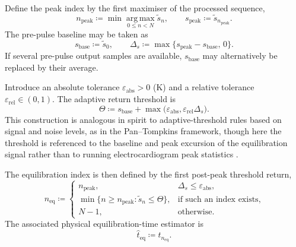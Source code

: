 Define the peak index by the first maximiser of the processed sequence,
\begin{equation}
    n_{\mathrm{peak}}
    \coloneqq
    \min\operatorname*{arg\,max}_{0\le n < N} \tilde s_n,
    \qquad
    s_{\mathrm{peak}} \coloneqq \tilde s_{n_{\mathrm{peak}}}.
    \label{eq:app-peak-index}
\end{equation}
The pre-pulse baseline may be taken as
\begin{equation}
    s_{\mathrm{base}} \coloneqq \tilde s_0,
    \qquad
    \Delta_s \coloneqq \max\{s_{\mathrm{peak}}-s_{\mathrm{base}},\,0\}.
    \label{eq:app-baseline-rise}
\end{equation}
If several pre-pulse output samples are available, \(s_{\mathrm{base}}\) may alternatively be replaced by their average.

Introduce an absolute tolerance \(\varepsilon_{\mathrm{abs}}>0\) (K) and a relative tolerance
\(\varepsilon_{\mathrm{rel}}\in(0,1)\). The adaptive return threshold is
\begin{equation}
    \Theta
    \coloneqq
    s_{\mathrm{base}}
    +
    \max\!\bigl(
    \varepsilon_{\mathrm{abs}},
    \varepsilon_{\mathrm{rel}}\Delta_s
    \bigr).
    \label{eq:app-threshold}
\end{equation}
This construction is analogous in spirit to adaptive-threshold rules based on signal and noise levels, as in the Pan--Tompkins framework, though here the threshold is referenced to the baseline and peak excursion of the equilibration signal rather than to running electrocardiogram peak statistics \cite{Pan_1985}.

The equilibration index is then defined by the first post-peak threshold return,
\begin{equation}
    n_{\mathrm{eq}}
    \coloneqq
    \begin{cases}
        n_{\mathrm{peak}},
         & \Delta_s \le \varepsilon_{\mathrm{abs}}, \\[0.5ex]
        \min\{n\ge n_{\mathrm{peak}} : \tilde s_n \le \Theta\},
         & \text{if such an index exists},          \\[0.5ex]
        N-1,
         & \text{otherwise}.
    \end{cases}
    \label{eq:app-neq}
\end{equation}
The associated physical equilibration-time estimator is
\begin{equation}
    \hat t_{\mathrm{eq}} \coloneqq t_{n_{\mathrm{eq}}}.
    \label{eq:app-teq}
\end{equation}

